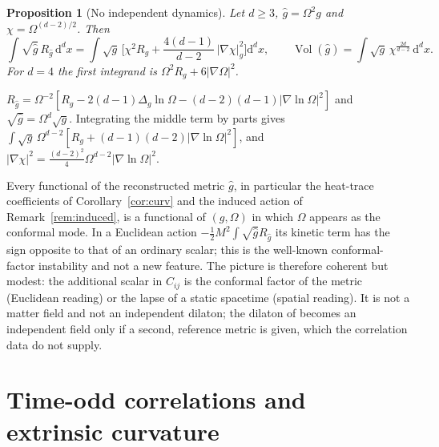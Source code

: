 \documentclass[11pt,a4paper]{article}
\makeatletter
\theoremstyle{stmt}
\newtheorem{proposition}[theorem]{Proposition}
\theoremstyle{defn}
\theoremstyle{rmk}
\renewenvironment{proof}[1][\proofname]{\par\pushQED{\qed}\normalfont\topsep6\p@\@plus6\p@\relax
  \trivlist\item[\hskip\labelsep{\sffamily\itshape\small #1.}]\ignorespaces}{\popQED\endtrivlist\@endpefalse}
\numberwithin{equation}{section}
\DeclareMathOperator{\Vol}{Vol}
\newcommand{\dd}{\mathrm{d}}
\makeatother
\begin{document}
\begin{proposition}[No independent dynamics]\label{prop:conformal}
Let $d\ge3$, $\hat g=\Omega^2g$ and $\chi=\Omega^{(d-2)/2}$. Then
\begin{equation}
\int\sqrt{\hat g}\,R_{\hat g}\,\dd^dx=\int\sqrt g\,\Big[\chi^2R_g+\frac{4(d-1)}{d-2}\,|\nabla\chi|_g^2\Big]\dd^dx,\qquad \Vol(\hat g)=\int\sqrt g\,\chi^{\frac{2d}{d-2}}\,\dd^dx .
\end{equation}
For $d=4$ the first integrand is $\Omega^2R_g+6|\nabla\Omega|^2$.
\end{proposition}

\begin{proof}
$R_{\hat g}=\Omega^{-2}[R_g-2(d-1)\Delta_g\ln\Omega-(d-2)(d-1)|\nabla\ln\Omega|^2]$ and $\sqrt{\hat g}=\Omega^d\sqrt g$. Integrating the middle term by parts gives $\int\sqrt g\,\Omega^{d-2}[R_g+(d-1)(d-2)|\nabla\ln\Omega|^2]$, and $|\nabla\chi|^2=\tfrac{(d-2)^2}{4}\Omega^{d-2}|\nabla\ln\Omega|^2$.
\end{proof}

Every functional of the reconstructed metric $\hat g$, in particular the heat-trace coefficients of Corollary~\ref{cor:curv} and the induced action of Remark~\ref{rem:induced}, is a functional of $(g,\Omega)$ in which $\Omega$ appears as the conformal mode. In a Euclidean action $-\tfrac12M^2\int\sqrt{\hat g}R_{\hat g}$ its kinetic term has the sign opposite to that of an ordinary scalar; this is the well-known conformal-factor instability and not a new feature. The picture is therefore coherent but modest: the additional scalar in $C_{ij}$ is the conformal factor of the metric (Euclidean reading) or the lapse of a static spacetime (spatial reading). It is not a matter field and not an independent dilaton; the dilaton of \cite{CC06} becomes an independent field only if a second, reference metric is given, which the correlation data do not supply.

\section{Time-odd correlations and extrinsic curvature}\label{sec:time}
\end{document}
